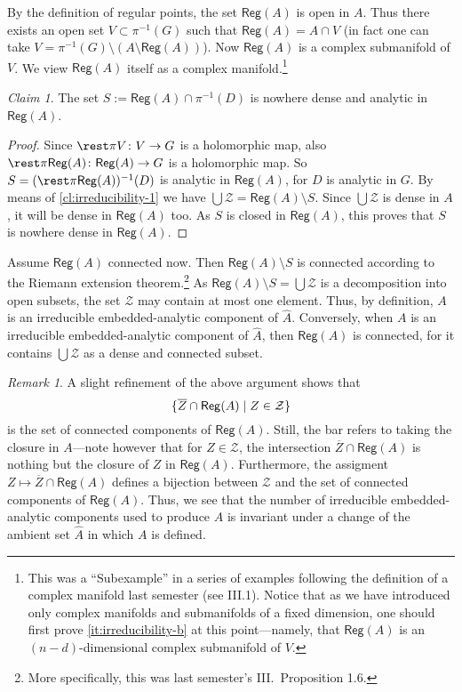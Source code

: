 \documentclass[a4paper]{amsart}
\newcommand{\Reg}[1]{\mathsf{Reg}(#1)}
\theoremstyle{remark}
\newtheorem{claim}{Claim}[question]
\newtheorem{remark}{Remark}[question]
\numberwithin{equation}{question}
\DeclarePairedDelimiter\set{\{}{\}}
\begin{document}
\begin{solution}
\begin{solenum}
By the definition of regular points, the set $\Reg A$ is open in $A$. Thus there exists an open set $V \subset \pi^{-1}(G)$ such that $\Reg A = A \cap V$ (in fact one can take $V = \pi^{-1}(G) \setminus (A \setminus \Reg A)$). Now $\Reg A$ is a complex submanifold of $V$. We view $\Reg A$ itself as a complex manifold.\footnote{This was a “Subexample” in a series of examples following the definition of a complex manifold last semester (see III.1). Notice that as we have introduced only complex manifolds and submanifolds of a fixed dimension, one should first prove \cref{it:irreducibility-b} at this point---namely, that $\Reg A$ is an $(n-d)$-dimensional complex submanifold of $V$.}

\begin{claim}
The set $S := \Reg A \cap \pi^{-1}(D)$ is nowhere dense and analytic in $\Reg A$.
\end{claim}
\begin{proof}
Since $\rest\pi V \colon V \to G$ is a holomorphic map, also $\rest\pi{\Reg A} \colon \Reg A \to G$ is a holomorphic map. So $S = (\rest\pi{\Reg A})^{-1}(D)$ is analytic in $\Reg A$, for $D$ is analytic in $G$.
By means of \cref{cl:irreducibility-1} we have $\bigcup\mathcal Z = \Reg A \setminus S$. Since $\bigcup\mathcal Z$ is dense in $A$, it will be dense in $\Reg A$ too. As $S$ is closed in $\Reg A$, this proves that $S$ is nowhere dense in $\Reg A$.
\end{proof}

Assume $\Reg A$ connected now. Then $\Reg A \setminus S$ is connected according to the Riemann extension theorem.\footnote{More specifically, this was last semester's III.~Proposition 1.6.} As $\Reg A \setminus S = \bigcup\mathcal Z$ is a decomposition into open subsets, the set $\mathcal Z$ may contain at most one element. Thus, by definition, $A$ is an irreducible embedded-analytic component of $\hat A$. Conversely, when $A$ is an irreducible embedded-analytic component of $\hat A$, then $\Reg A$ is connected, for it contains $\bigcup\mathcal Z$ as a dense and connected subset.

\begin{remark}
A slight refinement of the above argument shows that
\[
\set{\overline Z \cap \Reg A \mid Z \in \mathcal Z}
\]
is the set of connected components of $\Reg A$. Still, the bar refers to taking the closure in $A$---note however that for $Z \in \mathcal Z$, the intersection $\overline Z \cap \Reg A$ is nothing but the closure of $Z$ in $\Reg A$. Furthermore, the assigment $Z \mapsto \overline Z \cap \Reg A$ defines a bijection between $\mathcal Z$ and the set of connected components of $\Reg A$. Thus, we see that the number of irreducible embedded-analytic components used to produce $A$ is invariant under a change of the ambient set $\hat A$ in which $A$ is defined.
\end{remark}


\end{solenum}
\end{solution}
\end{document}
